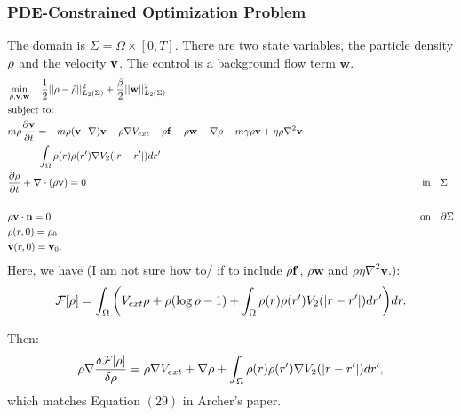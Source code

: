 
\subsubsection*{PDE-Constrained Optimization Problem}
The domain is $\Sigma=\Omega \times [0,T]$. There are two state variables, the particle density $\rho$ and the velocity $\mathbf{v}$. The control is a background flow term $\mathbf{w}$. 
\begin{align*}
&\min_{\rho,\mathbf{v},\mathbf{w} } \quad \frac{1}{2}||\rho - \hat {\rho}||_{L_2(\Sigma)}^2  +\frac{\beta}{2}||\mathbf{w}||_{L_2(\Sigma)}^2\\
&\text{subject to:}\\
&m \rho \frac{\partial \mathbf{v}}{\partial t}= - m \rho (\mathbf{v} \cdot \nabla)\mathbf{v} -\rho \nabla V_{ext} -\rho \mathbf{f} -\rho \mathbf{w} - \nabla \rho - m\gamma \rho \mathbf{v} + \eta \rho \nabla^2 \mathbf{v} \\
& \quad \quad -\int_\Omega \rho(r) \rho(r') \nabla V_2(|r-r'|)dr' \\
&\frac{\partial \rho}{\partial t} + \nabla \cdot (\rho \mathbf{v})=0 \qquad\qquad \qquad\qquad\qquad\quad \quad\quad\qquad \qquad\qquad \qquad\qquad\qquad\quad \qquad\qquad\qquad\quad\ \ \text{in} \quad \Sigma\\
\\
&\rho \mathbf{v} \cdot \mathbf{n} =0\qquad\qquad \qquad\qquad\qquad\qquad\qquad\qquad\qquad \qquad\qquad \qquad\qquad\qquad \qquad\qquad\qquad\quad \qquad \text{on} \quad \partial  \Sigma\\
& \rho(r,0)=\rho_0\\
& \mathbf{v}(r,0)=\mathbf{v}_0.
\end{align*}
Here, we have (I am not sure how to/ if to include $\rho \mathbf{f}$, $\rho \mathbf{w}$ and $\rho \eta \nabla^2 \mathbf{v}$.):
\begin{align*}
\mathcal{F}[\rho]=\int_\Omega  \bigg( V_{ext}\rho + \rho (\log \rho -1) +  \int_\Omega \rho(r) \rho(r')V_2(|r-r'|)dr' \bigg) dr.
\end{align*}

Then:
\begin{align*}
\rho \nabla \frac{\delta \mathcal{F}[\rho]}{\delta \rho} = \rho \nabla V_{ext} + \nabla \rho + \int_\Omega \rho(r) \rho(r') \nabla V_2(|r-r'|)dr',
\end{align*}
which matches Equation $(29)$ in Archer's paper.
